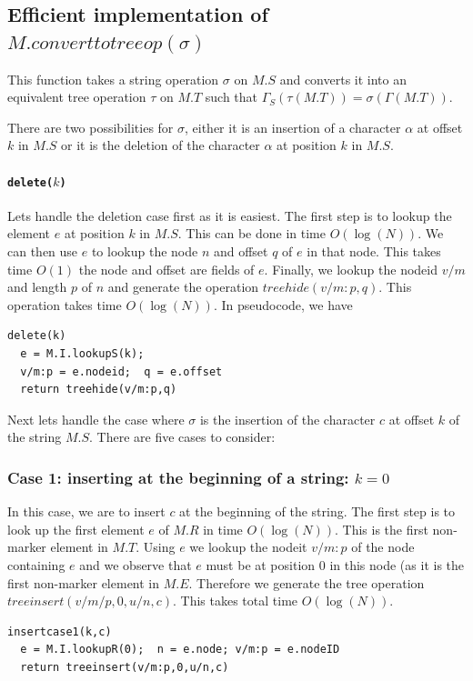 \documentclass{amsart}
\begin{document}
\subsection{Efficient implementation of $M.converttotreeop(\sigma)$}
This function takes a string operation $\sigma$ on $M.S$ and converts it into
an equivalent tree operation 
$\tau$ on $M.T$ such that
$\Gamma_S(\tau(M.T)) = \sigma(\Gamma(M.T))$.

There are two possibilities for $\sigma$, either it is an insertion of a character $\alpha$ at offset $k$ in $M.S$ or it is the deletion of the character $\alpha$ at position $k$ in $M.S$.  

\paragraph {{\tt delete($k$)}} 
Lets handle the deletion case first as it is easiest. The first step is to lookup the element $e$ at position $k$ in $M.S$. This can be done in time $O(\log(N))$.
We can then use $e$ to lookup the node $n$ and offset $q$ of $e$ in that node.
This takes time $O(1)$ the node and offset are fields of $e$. Finally, we lookup the
nodeid $v/m$ and length $p$ of $n$ and generate the operation $treehide(v/m:p,q)$. This operation takes time $O(\log(N))$. In pseudocode, we have
\begin{verbatim}
delete(k)
  e = M.I.lookupS(k);
  v/m:p = e.nodeid;  q = e.offset
  return treehide(v/m:p,q)
\end{verbatim}

Next lets handle the case where $\sigma$ is the insertion of the character $c$
at offset $k$ of the string $M.S$.  There are five cases to consider:

\subsubsection{Case 1: inserting at the beginning of a string: $k=0$}
In this case, we are to insert $c$ at the beginning of the string.
The first step is to look up the first element $e$ of $M.R$ in time $O(\log(N))$.
This is the first non-marker element in $M.T$. Using $e$ we lookup the
nodeit $v/m:p$ of the node containing $e$ and we observe that $e$ must be at position 0 in this node (as it is the first non-marker element in $M.E$. Therefore
we generate the tree operation $treeinsert(v/m/p,0,u/n,c)$. This takes total time $O(\log(N))$.
\begin{verbatim}
insertcase1(k,c)
  e = M.I.lookupR(0);  n = e.node; v/m:p = e.nodeID
  return treeinsert(v/m:p,0,u/n,c)
\end{verbatim}
\end{document}
